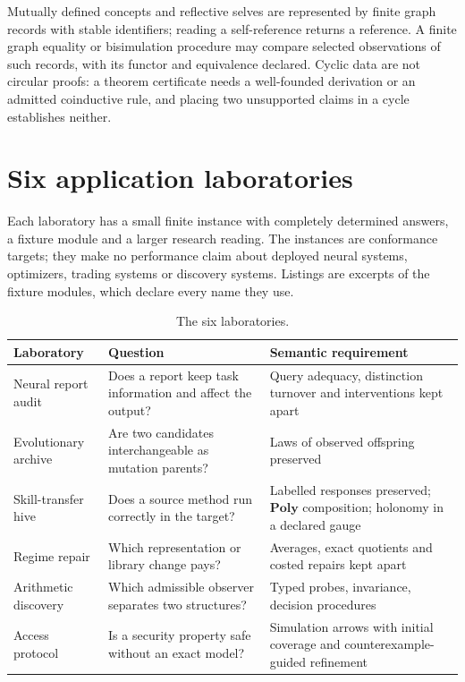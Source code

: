 \documentclass[11pt]{article}
\newcommand{\Poly}{\mathbf{Poly}}
\theoremstyle{definition}
\theoremstyle{plain}
\begin{document}
Mutually defined concepts and reflective selves are represented by finite graph records with stable
identifiers; reading a self-reference returns a reference. A finite graph equality or bisimulation
procedure may compare selected observations of such records, with its functor and equivalence
declared. Cyclic data are not circular proofs: a theorem certificate needs a well-founded derivation
or an admitted coinductive rule, and placing two unsupported claims in a cycle establishes neither.

\section{Six application laboratories}\label{sec:labs}

Each laboratory has a small finite instance with completely determined answers, a fixture module and
a larger research reading. The instances are conformance targets; they make no performance claim
about deployed neural systems, optimizers, trading systems or discovery systems. Listings are
excerpts of the fixture modules, which declare every name they use.

\begin{table}[ht]
\centering\small
\begin{tabularx}{\textwidth}{>{\raggedright\arraybackslash}p{3.0cm}>{\raggedright\arraybackslash}X>{\raggedright\arraybackslash}X}
\toprule
Laboratory & Question & Semantic requirement\\
\midrule
Neural report audit & Does a report keep task information and affect the output? & Query adequacy, distinction turnover and interventions kept apart\\
Evolutionary archive & Are two candidates interchangeable as mutation parents? & Laws of observed offspring preserved\\
Skill-transfer hive & Does a source method run correctly in the target? & Labelled responses preserved; $\Poly$ composition; holonomy in a declared gauge\\
Regime repair & Which representation or library change pays? & Averages, exact quotients and costed repairs kept apart\\
Arithmetic discovery & Which admissible observer separates two structures? & Typed probes, invariance, decision procedures\\
Access protocol & Is a security property safe without an exact model? & Simulation arrows with initial coverage and counterexample-guided refinement\\
\bottomrule
\end{tabularx}
\caption{The six laboratories.}
\end{table}
\end{document}
